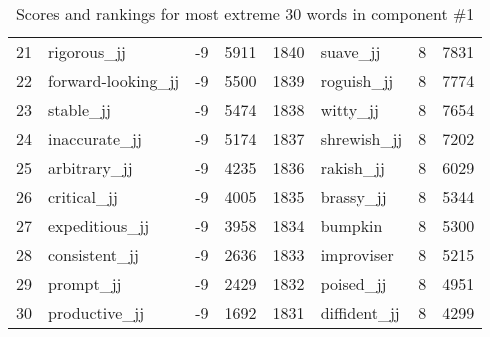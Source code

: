 \begin{table}[tbp]
\begin{tabular}{| rlr@{.}l | rlr@{.}l |}
    21 & rigorous\_jj & -9 & 5911    &    1840 & suave\_jj & 8 & 7831 \\
    22 & forward-looking\_jj & -9 & 5500    &    1839 & roguish\_jj & 8 & 7774 \\
    23 & stable\_jj & -9 & 5474    &    1838 & witty\_jj & 8 & 7654 \\
    24 & inaccurate\_jj & -9 & 5174    &    1837 & shrewish\_jj & 8 & 7202 \\
    25 & arbitrary\_jj & -9 & 4235    &    1836 & rakish\_jj & 8 & 6029 \\
    26 & critical\_jj & -9 & 4005    &    1835 & brassy\_jj & 8 & 5344 \\
    27 & expeditious\_jj & -9 & 3958    &    1834 & bumpkin & 8 & 5300 \\
    28 & consistent\_jj & -9 & 2636    &    1833 & improviser & 8 & 5215 \\
    29 & prompt\_jj & -9 & 2429    &    1832 & poised\_jj & 8 & 4951 \\
    30 & productive\_jj & -9 & 1692    &    1831 & diffident\_jj & 8 & 4299 \\
    \hline
    \end{tabular}
    \caption{Scores and rankings for most extreme 30 words in component \#1} 
\end{table}
\clearpage
